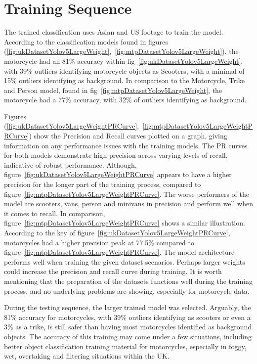 \documentclass[12pt]{report} %
\begin{document}
	\section{Training Sequence}
		The trained classification uses Asian and US footage to train the model. According to the classification models found in figures (\ref{fig:ukDatasetYolov5LargeWeight},~\ref{fig:mtpDatasetYolov5LargeWeight}), the motorcycle had an 81\% accuracy within fig~\ref{fig:ukDatasetYolov5LargeWeight}, with 39\% outliers identifying motorcycle objects as Scooters, with a minimal of 15\% outliers identifying as background. In comparison to the Motorcycle, Trike and Person model, found in fig~\ref{fig:mtpDatasetYolov5LargeWeight}, the motorcycle had a 77\% accuracy, with 32\% of outliers identifying as background.

		Figures (\ref{fig:ukDatasetYolov5LargeWeightPRCurve},~\ref{fig:mtpDatasetYolov5LargeWeightPRCurve}) show the Precision and Recall curves plotted on a graph, giving information on any performance issues with the training models. The PR curves for both models demonstrate high precision across varying levels of recall, indicative of robust performance. Although, figure~\ref{fig:ukDatasetYolov5LargeWeightPRCurve} appears to have a higher precision for the longer part of the training process, compared to figure~\ref{fig:mtpDatasetYolov5LargeWeightPRCurve}. The worse performers of the model are scooters, vans, person and minivans in precision and perform well when it comes to recall. In comparison, figure~\ref{fig:mtpDatasetYolov5LargeWeightPRCurve} shows a similar illustration. According to the key of figure~\ref{fig:ukDatasetYolov5LargeWeightPRCurve}, motorcycles had a higher precision peak at 77.5\% compared to figure~\ref{fig:mtpDatasetYolov5LargeWeightPRCurve}. The model architecture performs well when training the given dataset scenarios. Perhaps larger weights could increase the precision and recall curve during training. It is worth mentioning that the preparation of the datasets functions well during the training process, and no underlying problems are showing, especially for motorcycle data.

		During the testing sequence, the larger trained model was selected. Arguably, the 81\% accuracy for motorcycles, with 39\% outliers identifying as scooters or even a 3\% as a trike, is still safer than having most motorcycles identified as background objects. The accuracy of this training may come under a few situations, including better object classification training material for motorcycles, especially in foggy, wet, overtaking and filtering situations within the UK. 
\end{document}
